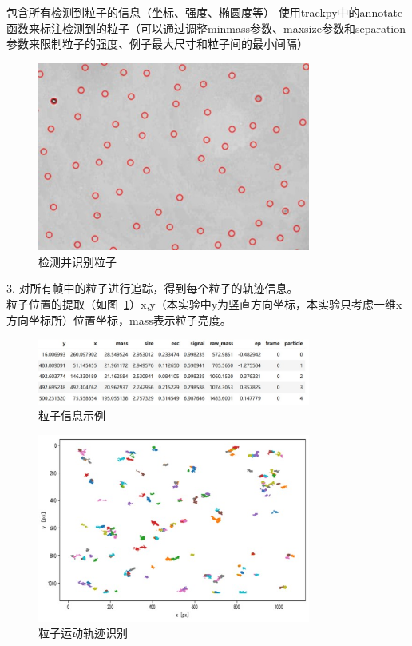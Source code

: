 \documentclass[a4paper]{report} %
\begin{document}
包含所有检测到粒子的信息（坐标、强度、椭圆度等）
使用trackpy中的annotate函数来标注检测到的粒子（可以通过调整minmass参数、maxsize参数和separation参数来限制粒子的强度、例子最大尺寸和粒子间的最小间隔）
\begin{figure}[H]
    \centering
    \includegraphics[width=0.8\textwidth]{识别粒子.jpg}
    \caption{检测并识别粒子}
\end{figure} 
3. 对所有帧中的粒子进行追踪，得到每个粒子的轨迹信息。\\
粒子位置的提取（如图~\ref{fig:guijitu}）x,y（本实验中y为竖直方向坐标，本实验只考虑一维x方向坐标所）位置坐标，mass表示粒子亮度。
\begin{figure}[H]
    \centering
    \includegraphics[width=0.8\textwidth]{粒子信息.jpg}
    \caption{粒子信息示例}
\end{figure} 
\begin{figure}[H]
    \centering
    \includegraphics[width=0.8\textwidth]{粒子轨迹图.jpg}
    \caption{粒子运动轨迹识别}
    \label{fig:guijitu}
\end{figure} 
\end{document}
